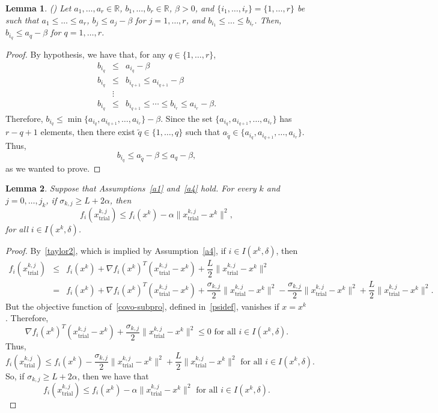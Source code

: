 \documentclass[11pt]{article}
\newcommand{\R}{\mathbb{R}}
\newcommand{\xkjtrial}{x^{k,j}_{\mathrm{trial}}}
\newtheorem{lemma}{Lemma}[section]
\begin{document}
\begin{lemma} (\cite[Lemma 2.1]{dunder1}) \label{lem3}
Let $a_1, \dots, a_r \in \R$, $b_1, \dots, b_r \in \R$, $\beta > 0$, and $\{i_1, \dots, i_r\} = \{1, \dots, r \}$ be such that $a_1 \leq \dots \leq a_r$, $b_j \leq a_j - \beta$ for $j = 1, \dots, r$, and $b_{i_1} \leq \dots \leq b_{i_r}$. Then, $b_{i_q} \leq a_q - \beta$ for $q=1,\dots,r$.
\end{lemma}
\begin{proof}
By hypothesis, we have that, for any $q \in \{1,\dots,r\}$,
\[
\begin{array}{ccl}
b_{i_q} &\leq & a_{i_q} - \beta\\
b_{i_q} &\leq & b_{i_{q+1}}\leq a_{i_{q+1}}-\beta\\
&\vdots &\\
b_{i_q} &\leq & b_{i_{q+1}}\leq\cdots\leq b_{i_r}\leq a_{i_r}-\beta.
\end{array}
\]
Therefore, $b_{i_q} \leq \min \{ a_{i_q}, a_{i_{q+1}}, \dots, a_{i_r} \} - \beta$. Since the set $\{a_{i_q}, a_{i_{q+1}}, \dots, a_{i_r}\}$ has $r-q+1$ elements, then there exist $\tilde q\in\{1,\dots,q\}$ such that $a_{\tilde q} \in \{ a_{i_q}, a_{i_{q+1}}, \dots, a_{i_r} \}$. Thus, 
\[
b_{i_q} \leq a_{\tilde q} - \beta \leq a_q - \beta,
\]
as we wanted to prove.
\end{proof}

\begin{lemma} \label{lem4}
Suppose that Assumptions~\ref{a1} and~\ref{a4} hold. For every $k$ and $j=0,\dots,j_k$, if $\sigma_{k,j} \geq  L + 2 \alpha$, then
\begin{equation}
f_i(\xkjtrial) \leq f_i(x^k) - \alpha \|\xkjtrial - x^k\|^2,
\end{equation}
for all $i \in I(x^k,\delta)$.
\end{lemma}

\begin{proof}
By~\eqref{taylor2}, which is implied by Assumption~\ref{a4}, if $i \in I(x^k,\delta)$, then
\[
\begin{array}{rcl}
f_i(\xkjtrial) & \leq & f_i(x^k) + \nabla f_i(x^k)^T (\xkjtrial - x^k) + \dfrac{L}{2} \| \xkjtrial - x^k \|^2\\[2mm]
&=& f_i(x^k) + \nabla f_i(x^k)^T (\xkjtrial - x^k) + \dfrac{\sigma_{k,j}}{2} \| \xkjtrial - x^k \|^2 - \dfrac{\sigma_{k,j}}{2} \|\xkjtrial - x^k\|^2 + \dfrac{L}{2}\|\xkjtrial - x^k\|^2.
\end{array}
\]
But the objective function of~\eqref{covo-subpro}, defined in~\eqref{psidef}, vanishes if $x = x^k$. Therefore, 
\[
\nabla f_i(x^k)^T (\xkjtrial - x^k) + \dfrac{\sigma_{k,j}}{2} \|\xkjtrial - x^k\|^2 \leq 0 \mbox{ for all } i \in I(x^k,\delta).
\]
Thus,
\[
f_i(\xkjtrial) \leq f_i(x^k) - \dfrac{\sigma_{k,j}}{2}\|\xkjtrial - x^k\|^2 + \dfrac{L}{2}\|\xkjtrial - x^k\|^2 \mbox{ for all } i \in I(x^k,\delta).
\]   
So, if $\sigma_{k,j} \geq L + 2\alpha$, then we have that
\[
f_i(\xkjtrial) \leq f_i(x^k) - \alpha \|\xkjtrial - x^k\|^2 \mbox{ for all } i \in I(x^k,\delta).
\]
\end{proof}
\end{document}
